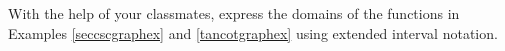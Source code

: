 {With the help of your classmates, express the domains of the functions in Examples \ref{seccscgraphex} and \ref{tancotgraphex} using extended interval notation.  }
{}

